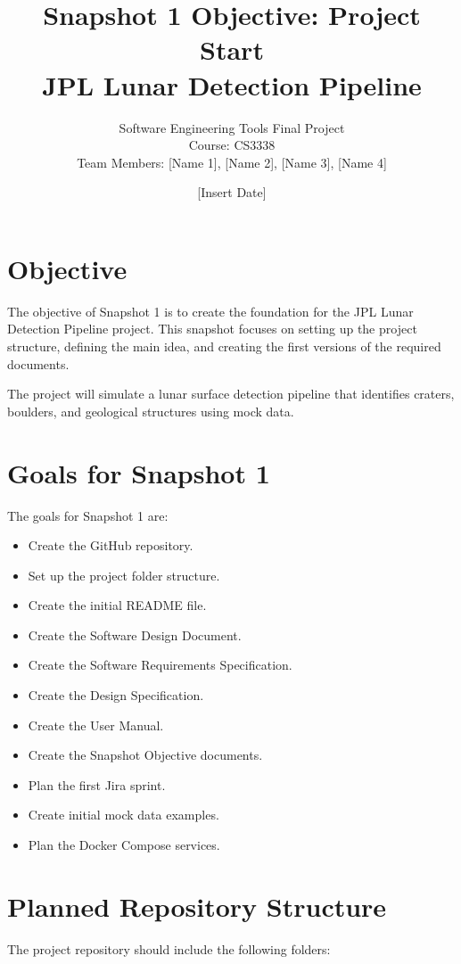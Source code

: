 \documentclass[12pt]{article}
\title{
    \textbf{Snapshot 1 Objective: Project Start} \\
    JPL Lunar Detection Pipeline
}
\author{
    Software Engineering Tools Final Project \\
    Course: CS3338 \\
    Team Members: [Name 1], [Name 2], [Name 3], [Name 4]
}
\date{[Insert Date]}
\begin{document}
\maketitle
\newpage

\section{Objective}

The objective of Snapshot 1 is to create the foundation for the JPL Lunar Detection Pipeline project. This snapshot focuses on setting up the project structure, defining the main idea, and creating the first versions of the required documents.

The project will simulate a lunar surface detection pipeline that identifies craters, boulders, and geological structures using mock data.

\section{Goals for Snapshot 1}

The goals for Snapshot 1 are:

\begin{itemize}
    \item Create the GitHub repository.
    \item Set up the project folder structure.
    \item Create the initial README file.
    \item Create the Software Design Document.
    \item Create the Software Requirements Specification.
    \item Create the Design Specification.
    \item Create the User Manual.
    \item Create the Snapshot Objective documents.
    \item Plan the first Jira sprint.
    \item Create initial mock data examples.
    \item Plan the Docker Compose services.
\end{itemize}

\section{Planned Repository Structure}

The project repository should include the following folders:
\end{document}
